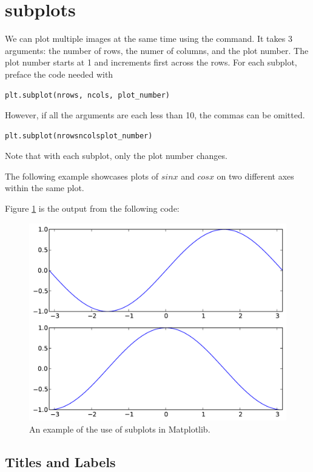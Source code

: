 \section*{subplots}

We can plot multiple images at the same time using the  command. 
It takes 3 arguments: the number of rows, the numer of columns, and the plot number. 
The plot number starts at 1 and increments first across the rows. 
For each subplot, preface the code needed with
\begin{lstlisting}
plt.subplot(nrows, ncols, plot_number)
\end{lstlisting}
However, if all the arguments are each less than 10, the commas can be 
omitted. 
\begin{lstlisting}
plt.subplot(nrowsncolsplot_number)
\end{lstlisting}
Note that with each subplot, only the plot number changes. 

The following example showcases plots of $sin x$ and $cos x$ on two 
different axes within the same plot.

Figure \ref{mpl:subplots} is the output from the following code:



\begin{figure} 
\includegraphics[width=\textwidth]{subplots.pdf}
\caption{An example of the use of subplots in Matplotlib.}
\label{mpl:subplots} 
\end{figure}

\subsection*{Titles and Labels}


